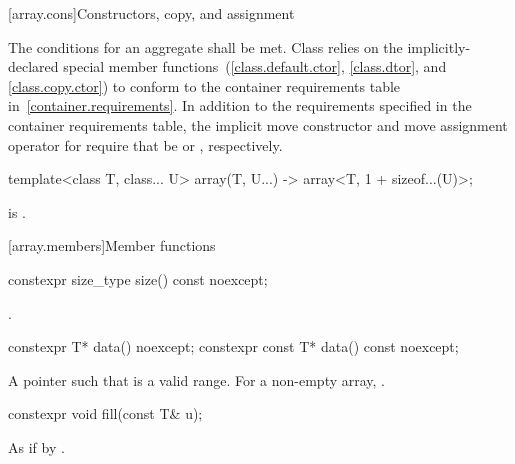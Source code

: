 [array.cons]{Constructors, copy, and assignment}

\pnum
{}%
%
The conditions for an aggregate shall be
met. Class  relies on the implicitly-declared special
member functions~(\ref{class.default.ctor}, \ref{class.dtor}, and \ref{class.copy.ctor}) to
conform to the container requirements table in~\ref{container.requirements}.
In addition to the requirements specified in the container requirements table,
the implicit move constructor and move assignment operator for 
require that  be  or ,
respectively.

\begin{itemdecl}
template<class T, class... U>
  array(T, U...) -> array<T, 1 + sizeof...(U)>;
\end{itemdecl}
\begin{itemdescr}
\pnum
\mandates
{} is .
\end{itemdescr}

[array.members]{Member functions}

%
\begin{itemdecl}
constexpr size_type size() const noexcept;
\end{itemdecl}

\begin{itemdescr}
\pnum
\returns
{}.
\end{itemdescr}

%
\begin{itemdecl}
constexpr T* data() noexcept;
constexpr const T* data() const noexcept;
\end{itemdecl}

\begin{itemdescr}
\pnum
\returns
A pointer such that  is a valid range. For a
non-empty array,  \tcode{==} .
\end{itemdescr}

%
\begin{itemdecl}
constexpr void fill(const T& u);
\end{itemdecl}

\begin{itemdescr}
\pnum
\effects
As if by .
\end{itemdescr}

